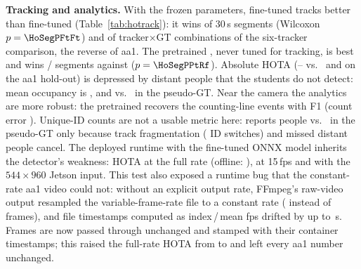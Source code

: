 \textbf{Tracking and analytics.} With the frozen parameters, fine-tuned \rfdetr{} tracks better than fine-tuned \yolo{}
(Table~\ref{tab:hotrack}): it wins \HoSegWinsRf{} of \HoSegs{} 30\,s segments (Wilcoxon $p=\HoSegPFtFt$) and
\HoTcWinsRf{} of \HoTcPairs{} tracker$\times$GT combinations of the six-tracker comparison, the reverse of aa1. The
pretrained \yolo{}, never tuned for tracking, is best and wins \HoSegWinsPt/\HoSegs{} segments against \rfdetr{}
($p=\HoSegPPtRf$). Absolute HOTA (\HoBtHotaYoloFtTun--\HoBtHotaYoloPtTun{} vs.\ \BtHotaYoloTun{} and \BtHotaRfTun{} on the aa1 hold-out) is depressed by distant people that the
students do not detect: mean occupancy is \HoAnOccYoloFt, \HoAnOccRfFt{} and \HoAnOccYoloPt{} vs.\ \HoAnGtOcc{} in the
pseudo-GT. Near the camera the analytics are more robust: the pretrained \yolo{} recovers the counting-line events
with F1 \HoAnCrossFoneYoloPt{} (count error \HoAnCrossErrYoloPt). Unique-ID counts are not a usable metric here:
\rfdetr{} reports \HoAnUniqueRfFt{} people vs.\ \HoAnGtUnique{} in the pseudo-GT only because track fragmentation
(\HoBtIdswRfFtTun{} ID switches) and missed distant people cancel.
\ifHaveHeldoutEdge
The deployed runtime with the fine-tuned \yolo{} ONNX model inherits the detector's weakness: HOTA
\HoEdHotaHiSOne{} at the full rate (offline: \HoEdRefHota), \HoEdHotaHiSFour{} at 15\,fps and \HoEdHotaMidSFour{} with
the $544{\times}960$ Jetson input. This test also exposed a runtime bug that the constant-rate aa1 video could not:
without an explicit output rate, FFmpeg's raw-video output resampled the variable-frame-rate file to a constant rate
(\HoVfrDelivered{} instead of \HoVfrFrames{} frames), and file timestamps computed as index\,/\,mean fps drifted by up
to \HoVfrTsErr\,s. Frames are now passed through unchanged and stamped with their container timestamps; this raised
the full-rate HOTA from \HoVfrHotaBefore{} to \HoEdHotaHiSOne{} and left every aa1 number unchanged.
\fi
\fi
